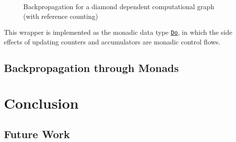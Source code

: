 \begin{figure}[htbp]
  \caption{Backpropagation for a diamond dependent computational graph (with reference counting)}
  \label{reference-counted backpropagation}
\end{figure}

This wrapper is implemented as the monadic data type \href{https://javadoc.io/page/com.thoughtworks.raii/asynchronous_2.11/latest/com/thoughtworks/raii/asynchronous$$Do.html}{\lstinline{Do}}, in which the side effects of updating counters and accumulators are monadic control flows.


\subsection{Backpropagation through Monads}




 

  
 














\section{Conclusion}
\subsection{Future Work}

\clearpage
\appendix

\printglossary

\begin{acks}
\end{acks}


